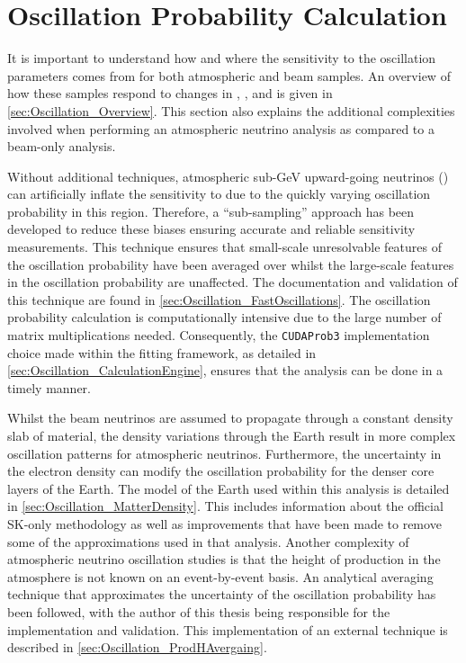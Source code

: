 \chapter{Oscillation Probability Calculation}
\label{chap:OscillationProbability}

It is important to understand how and where the sensitivity to the oscillation parameters comes from for both atmospheric and beam samples. An overview of how these samples respond to changes in , , and  is given in \autoref{sec:Oscillation_Overview}. This section also explains the additional complexities involved when performing an atmospheric neutrino analysis as compared to a beam-only analysis.

Without additional techniques, atmospheric sub-GeV upward-going neutrinos () can artificially inflate the sensitivity to  due to the quickly varying oscillation probability in this region. Therefore, a ``sub-sampling'' approach has been developed to reduce these biases ensuring accurate and reliable sensitivity measurements. This technique ensures that small-scale unresolvable features of the oscillation probability have been averaged over whilst the large-scale features in the oscillation probability are unaffected. The documentation and validation of this technique are found in \autoref{sec:Oscillation_FastOscillations}. The oscillation probability calculation is computationally intensive due to the large number of matrix multiplications needed. Consequently, the \texttt{CUDAProb3} implementation choice made within the fitting framework, as detailed in \autoref{sec:Oscillation_CalculationEngine}, ensures that the analysis can be done in a timely manner.

Whilst the beam neutrinos are assumed to propagate through a constant density slab of material, the density variations through the Earth result in more complex oscillation patterns for atmospheric neutrinos. Furthermore, the uncertainty in the electron density can modify the oscillation probability for the denser core layers of the Earth. The model of the Earth used within this analysis is detailed in \autoref{sec:Oscillation_MatterDensity}. This includes information about the official SK-only methodology as well as improvements that have been made to remove some of the approximations used in that analysis. Another complexity of atmospheric neutrino oscillation studies is that the height of production in the atmosphere is not known on an event-by-event basis. An analytical averaging technique that approximates the uncertainty of the oscillation probability has been followed, with the author of this thesis being responsible for the implementation and validation. This implementation of an external technique is described in \autoref{sec:Oscillation_ProdHAvergaing}.

